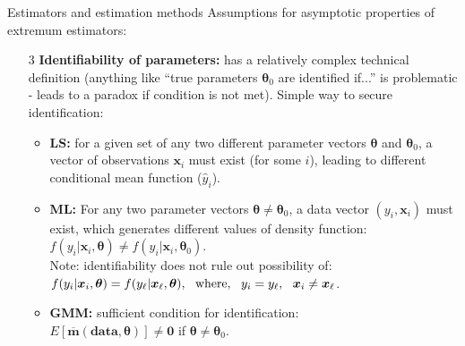 \documentclass{beamer}
\begin{document}
\begin{frame}{Estimators and estimation methods}
Assumptions for asymptotic properties of extremum estimators:
\small
\medskip
\begin{itemize}
    \item[3] \textbf{Identifiability of parameters:} has a relatively complex technical definition (anything like ``true parameters $\bm{\theta}_0$ are identified if...'' is problematic - leads to a paradox if condition is not met). Simple way to secure identification:
    \medskip
    \begin{itemize}
        \item \textbf{LS:} for a given set of any two different parameter vectors $\bm{\theta}$ and $\bm{\theta}_0$, a vector of  observations $\bm{x}_i$ must exist (for some $i$), leading to different conditional mean function ($\hat{y}_i$).
        \smallskip
        \item \textbf{ML:} For any two parameter vectors $\bm{\theta} \neq \bm{\theta}_0$, a data vector $(y_i, \bm{x}_i)$ must exist, which generates different values of density function: $f(y_i|\bm{x}_i,\bm{\theta}) \neq f(y_i|\bm{x}_i,\bm{\theta}_0)$. \\ \smallskip Note: identifiability does not rule out possibility of:\\$f(y_i|\bm{x}_i,\bm{\theta}) = f(y_{\ell}|\bm{x}_{\ell},\bm{\theta}), \textnormal{~~where},~~y_i=y_{\ell},~~\bm{x}_i \neq \bm{x}_{\ell}$.
        \smallskip
        \item \textbf{GMM:} sufficient condition for identification:\\ $E[\overline{\bm{m}}(\textbf{data},\bm{\theta})] \neq \bm{0}$ if $\bm{\theta} \neq \bm{\theta}_0$.
    \end{itemize}
\end{itemize}
\end{frame}
\end{document}
